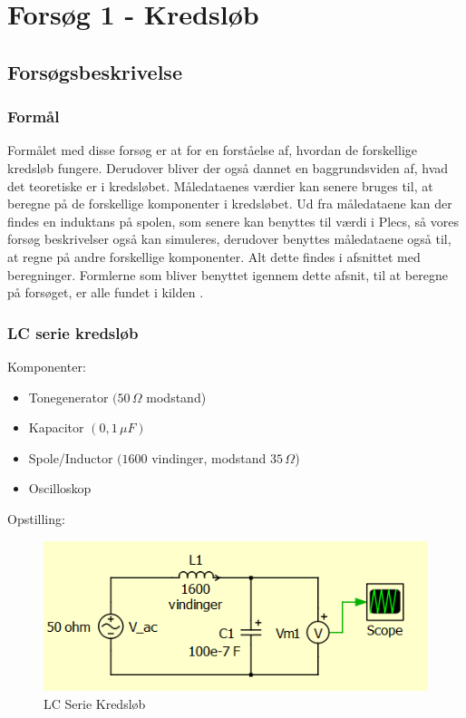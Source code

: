 \section{Forsøg 1 - Kredsløb}

\subsection{Forsøgsbeskrivelse}

\subsubsection{Formål}
Formålet med disse forsøg er at for en forståelse af, hvordan de forskellige kredsløb fungere. Derudover bliver der også dannet en baggrundsviden af, hvad det teoretiske er i kredsløbet. Måledataenes værdier kan senere bruges til, at beregne på de forskellige komponenter i kredsløbet. Ud fra måledataene kan der findes en induktans på spolen, som senere kan benyttes til værdi i Plecs, så vores forsøg beskrivelser også kan simuleres, derudover benyttes måledataene også til, at regne på andre forskellige komponenter. Alt dette findes i afsnittet med beregninger. Formlerne som bliver benyttet igennem dette afsnit, til at beregne på forsøget, er alle fundet i kilden \cite{fysikbog}.

\subsubsection{LC serie kredsløb}

Komponenter:

\begin{itemize}
\item Tonegenerator $(50\, \Omega$ modstand)
\item Kapacitor $( 0,1\, \mu F)$
\item Spole/Inductor $(1600$ vindinger, modstand $35 \, \Omega$)
\item Oscilloskop
\end{itemize}

Opstilling:

\begin{figure}[H]
\centering
\includegraphics[scale=1.25]{Vildledning/Schematics/Kredslb/LC_Serie}
\caption{LC Serie Kredsløb}
\label{lcserie}
\end{figure}

